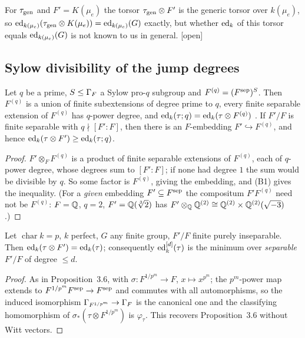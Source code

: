 \begin{remark}
For $\tau_{\mathrm{gen}}$ and $F'=K(\mu_e)$ the torsor $\tau_{\mathrm{gen}}\otimes F'$ is the generic
torsor over $k(\mu_e)$, so $\operatorname{ed}_{k(\mu_e)}(\tau_{\mathrm{gen}}\otimes K(\mu_e))=\operatorname{ed}_{k(\mu_e)}(G)$
exactly, but whether $\operatorname{ed}_k$ of this torsor equals $\operatorname{ed}_{k(\mu_e)}(G)$ is not known to
us in general. [open]
\end{remark}

\subsection{Sylow divisibility of the jump degrees}

\begin{lemma}[$q$-closure]\label{lem:qcl}
Let $q$ be a prime, $S\le\Gamma_F$ a Sylow pro-$q$ subgroup and $F^{(q)}=(F^{\rm sep})^S$.
Then $F^{(q)}$ is a union of finite subextensions of degree prime to $q$, every finite
separable extension of $F^{(q)}$ has $q$-power degree, and
$\operatorname{ed}_k(\tau;q)=\operatorname{ed}_k(\tau\otimes F^{(q)})$ \cite[(2.5)]{RS}. If $F'/F$ is finite
separable with $q\nmid[F':F]$, then there is an $F$-embedding $F'\hookrightarrow
F^{(q)}$, and hence $\operatorname{ed}_k(\tau\otimes F')\ge\operatorname{ed}_k(\tau;q)$.
\end{lemma}

\begin{proof}
$F'\otimes_FF^{(q)}$ is a product of finite separable extensions of $F^{(q)}$, each of
$q$-power degree, whose degrees sum to $[F':F]$; if none had degree $1$ the sum would
be divisible by $q$. So some factor is $F^{(q)}$, giving the embedding, and (B1)
gives the inequality. (For a \emph{given} embedding $F'\subseteq F^{\rm sep}$ the
compositum $F'F^{(q)}$ need not be $F^{(q)}$: $F=\mathbb Q$, $q=2$, $F'=\mathbb Q(\sqrt[3]2)$ has
$F'\otimes_\mathbb Q\mathbb Q^{(2)}\cong\mathbb Q^{(2)}\times\mathbb Q^{(2)}(\sqrt{-3})$.)
\end{proof}

\begin{lemma}\label{lem:pi}
Let $\operatorname{char}k=p$, $k$ perfect, $G$ any finite group, $F'/F$ finite purely
inseparable. Then $\operatorname{ed}_k(\tau\otimes F')=\operatorname{ed}_k(\tau)$; consequently
$\operatorname{ed}^{[d]}_k(\tau)$ is the minimum over \emph{separable} $F'/F$ of degree $\le d$.
\end{lemma}

\begin{proof}
As in Proposition~3.6, with $\sigma\colon F^{1/p^m}\to F$, $x\mapsto x^{p^m}$; the
$p^m$-power map extends to $F^{1/p^m}F^{\rm sep}\to F^{\rm sep}$ and commutes with all
automorphisms, so the induced isomorphism $\Gamma_{F^{1/p^m}}\to\Gamma_F$ is the canonical
one and the classifying homomorphism of $\sigma_*(\tau\otimes F^{1/p^m})$ is
$\varphi_\tau$. This recovers Proposition~3.6 without Witt vectors.
\end{proof}

